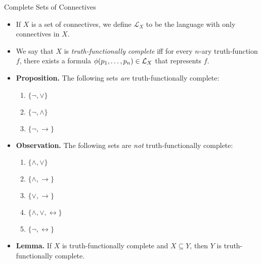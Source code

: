 \begin{frame}{Complete Sets of Connectives}

  \begin{itemize}
  \item If $X$ is a set of connectives, we define $\mathcal{L}_X$ to
    be the language with only connectives in $X$.

    \item We say that $X$ is \emph{truth-functionally
        complete} iff for every $n$-ary truth-function $f$, there
        exists a formula $\phi(p_1, \mathellipsis,
        p_n)\in\mathcal{L}_X$ that represents $f$.

      \item \textbf{Proposition.} The following sets \emph{are}
        truth-functionally complete:
        \begin{enumerate}[1.]
        \item $\{\neg,\lor\}$
        \item $\{\neg,\land\}$
        \item $\{\neg, \to\}$
        \end{enumerate}
      \item \textbf{Observation.} The following sets are \emph{not}
        truth-functionally complete:
        \begin{enumerate}[1.]
        \item $\{\land,\lor\}$
        \item $\{\land,\to\}$
        \item $\{\lor, \to\}$
        \item $\{\land,\lor,\leftrightarrow\}$
        \item $\{\neg, \leftrightarrow\}$
        \end{enumerate}
        \item \textbf{Lemma.} If $X$ is truth-functionally
          complete and $X\subseteq Y$, then $Y$ is truth-functionally complete.
  \end{itemize}
  
\end{frame}


